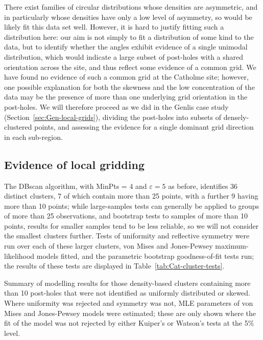 \documentclass[../../ArchStats.tex]{subfiles}
\begin{document}
There exist families of circular distributions whose densities are asymmetric, and in particularly whose densities have only a low level of asymmetry\cite[4.3.11]{Pewsey2014}, so would be likely fit this data set well. However, it is hard to justify fitting such a distribution here: our aim is not simply to fit a distribution of some kind to the data, but to identify whether the angles exhibit evidence of a single unimodal distribution, which would indicate a large subset of post-holes with a shared orientation across the site, and thus reflect some evidence of a common grid. We have found no evidence of such a common grid at the Catholme site; however, one possible explanation for both the skewness and the low concentration of the data may be the presence of more than one underlying grid orientation in the post-holes. We will therefore proceed as we did in the Genlis case study (Section~\ref{sec:Gen-local-grids}), dividing the post-holes into subsets of densely-clustered points, and assessing the evidence for a single dominant grid direction in each sub-region. 


\subsection{Evidence of local gridding}
The DBscan algorithm, with MinPts = 4 and $\varepsilon = 5$ as before, identifies 36 distinct clusters, 7 of which contain more than 25 points, with a further 9 having more than 10 points; while large-samples tests can generally be applied to groups of more than 25 observations, and bootstrap tests to samples of more than 10 points, results for smaller samples tend to be less reliable, so we will not consider the smallest clusters further. Tests of uniformity and reflective symmetry were run over each of these larger clusters, von Mises and Jones-Pewsey maximum-likelihood models fitted, and the parametric bootstrap goodness-of-fit tests run; the results of these tests are displayed in Table~\ref{tab:Cat-cluster-tests}.

\begin{table}[!ht]
\footnotesize
\centering
\hfill
\caption{Summary of modelling results for those density-based clusters containing more than 10 post-holes that were not identified as uniformly distributed or skewed. Where uniformity was rejected and symmetry was not, MLE parameters of von Mises and Jones-Pewsey models were estimated; these are only shown where the fit of the model was not rejected by either Kuiper's or Watson's tests at the 5\% level. }
\label{tab:Cat-cluster-tests}
\end{table}
\end{document}
